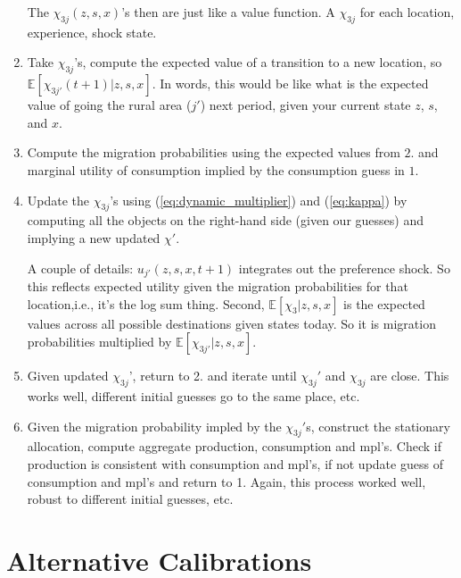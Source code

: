 \documentclass[12pt,pdftex]{article}
\begin{document}
\begin{onehalfspacing}
\begin{enumerate}
    The $\chi_{3j}(z, s, x)$'s then are just like a value function. A $\chi_{3j}$ for each location, experience, shock state.

\item Take $\chi_{3j}$'s, compute the expected value of a transition to a new location, so $\mathbb{E}\left[\chi_{3j'}(t+1)| z, s, x \right]$. In words, this would be like what is the expected value of going the rural area ($j'$) next period, given your current state $z$, $s$, and $x$.

\item Compute the migration probabilities using the expected values from $2.$ and marginal utility of consumption implied by the consumption guess in $1.$

\item Update the $\chi_{3j}$'s using (\ref{eq:dynamic_multiplier}) and (\ref{eq:kappa}) by computing all the objects on the right-hand side (given our guesses) and implying a new updated $\chi'$.

A couple of details: $u_{j'}(z,s,x,t+1)$ integrates out the preference shock. So this reflects expected utility given the migration probabilities for that location,i.e., it's the log sum thing. Second, $\mathbb{E}\left[\chi_{3} | z, s, x \right]$ is the expected values across all possible destinations given states today. So it is migration probabilities multiplied by $\mathbb{E}\left[\chi_{3j'}| z,s,x \right]$.

\item Given updated $\chi_{3j}$', return to 2. and iterate until $\chi_{3j}'$ and $\chi_{3j}$ are close. This works well, different initial guesses go to the same place, etc.

\item Given the migration probability impled by the $\chi_{3j}'$s, construct the stationary allocation, compute aggregate production, consumption and mpl's. Check if production is consistent with consumption and mpl's, if not update guess of consumption and mpl's and return to 1. Again, this process worked well, robust to different initial guesses, etc.
\end{enumerate}


\newpage

\section{Alternative Calibrations}


\end{onehalfspacing}
\end{document}
